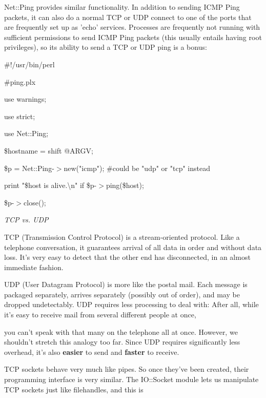 \documentclass[a4paper,11pt]{book}
\begin{document}
\noindent 

\noindent Net::Ping provides similar functionality. In addition to sending ICMP Ping packets, it can also do a normal TCP or UDP connect to one of the ports that are frequently set up as 'echo' services. Processes are frequently not running with sufficient permissions to send ICMP Ping packets (this usually entails having root privileges), so its ability to send a TCP or UDP ping is a bonus:

\noindent 

\noindent 

\noindent \#!/usr/bin/perl

\noindent \#ping.plx

\noindent use warnings;

\noindent use strict;

\noindent use Net::Ping;

\noindent 

\noindent \$hostname = shift @ARGV;

\noindent 

\noindent \$p = Net::Ping-$>$new("icmp"); \#could be "udp" or "tcp" instead

\noindent print "\$host is alive.\textbackslash n" if \$p-$>$ping(\$host);

\noindent \$p-$>$close();

\noindent 

\noindent \textit{TCP vs. UDP}

\noindent TCP (Transmission Control Protocol) is a stream-oriented protocol. Like a telephone conversation, it guarantees arrival of all data in order and without data loss. It's very easy to detect that the other end has disconnected, in an almost immediate fashion.

\noindent 

\noindent UDP (User Datagram Protocol) is more like the postal mail. Each message is packaged separately, arrives separately (possibly out of order), and may be dropped undetectably. UDP requires less processing to deal with: After all, while it's easy to receive mail from several different people at once,

\noindent you can't speak with that many on the telephone all at once. However, we shouldn't stretch this analogy too far. Since UDP requires significantly less overhead, it's also \textbf{easier }to send and \textbf{faster }to receive.

\noindent 

\noindent TCP sockets behave very much like pipes. So once they've been created, their programming interface is very similar. The IO::Socket module lets us manipulate TCP sockets just like filehandles, and this is
\end{document}
